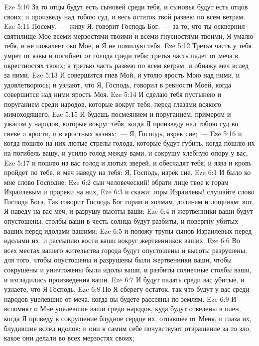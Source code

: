 \vs Eze 5:10 За то отцы будут есть сыновей среди тебя, и сыновья будут есть отцов своих; и произведу над тобою суд, и весь остаток твой развею по всем ветрам.
\vs Eze 5:11 Посему,~--- живу Я, говорит Господь Бог,~--- за то, что ты осквернил святилище Мое всеми мерзостями твоими и всеми гнусностями твоими, Я умалю тебя, и не пожалеет око Мое, и Я не помилую тебя.
\vs Eze 5:12 Третья часть у тебя умрет от язвы и погибнет от голода среди тебя; третья часть падет от меча в окрестностях твоих; а третью часть развею по всем ветрам, и обнажу меч вслед за ними.
\vs Eze 5:13 И совершится гнев Мой, и утолю ярость Мою над ними, и удовлетворюсь; и узнают, что Я, Господь, говорил в ревности Моей, когда совершится над ними ярость Моя.
\vs Eze 5:14 И сделаю тебя пустынею и поруганием среди народов, которые вокруг тебя, перед глазами всякого мимоходящего.
\vs Eze 5:15 И будешь посмеянием и поруганием, примером и ужасом у народов, которые вокруг тебя, когда Я произведу над тобою суд во гневе и ярости, и в яростных казнях;~--- Я, Господь, изрек сие;~---
\vs Eze 5:16 и когда пошлю на них лютые стрелы голода, которые будут губить, когда пошлю их на погибель вашу, и усилю голод между вами, и сокрушу хлебную опору у вас,
\vs Eze 5:17 и пошлю на вас голод и лютых зверей, и обесчадят тебя; и язва и кровь пройдет по тебе, и меч наведу на тебя; Я, Господь, изрек сие.
\vs Eze 6:1 И было ко мне слово Господне:
\vs Eze 6:2 сын человеческий! обрати лице твое к горам Израилевым и прореки на них,
\vs Eze 6:3 и скажи: горы Израилевы! слушайте слово Господа Бога. Так говорит Господь Бог горам и холмам, долинам и лощинам: вот, Я наведу на вас меч, и разрушу высоты ваши;
\vs Eze 6:4 и жертвенники ваши будут опустошены, столбы ваши в честь солнца будут разбиты, и повергну убитых ваших перед идолами вашими;
\vs Eze 6:5 и положу трупы сынов Израилевых перед идолами их, и рассыплю кости ваши вокруг жертвенников ваших.
\vs Eze 6:6 Во всех местах вашего жительства города будут опустошены и высоты разрушены, для того, чтобы опустошены и разрушены были жертвенники ваши, чтобы сокрушены и уничтожены были идолы ваши, и разбиты солнечные столбы ваши, и изгладились произведения ваши.
\vs Eze 6:7 И будут падать среди вас убитые, и узнаете, что Я Господь.
\vs Eze 6:8 Но Я сберегу остаток, так что будут у вас среди народов уцелевшие от меча, когда вы будете рассеяны по землям.
\vs Eze 6:9 И вспомнят о Мне уцелевшие ваши среди народов, куда будут отведены в плен, когда Я приведу в сокрушение блудное сердце их, отпавшее от Меня, и глаза их, блудившие вслед идолов; и они к самим себе почувствуют отвращение за то зло, какое они делали во всех мерзостях своих;
